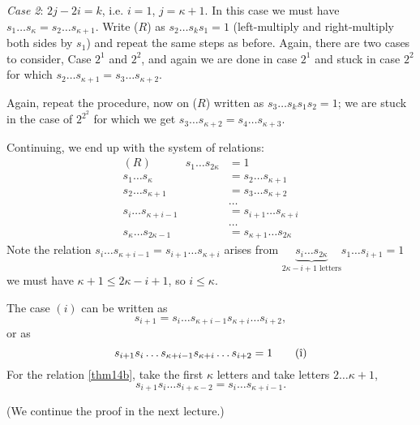 {\em Case 2}: $2j-2i=k$, i.e. $i=1$, $j=\kappa+1$. In this case we must have
$s_1 \dots s_\kappa = s_2 \dots s_{\kappa+1}$. Write ($R$) as
$s_2 \dots s_k s_1 = 1$ (left-multiply and right-multiply both sides by $s_1$)
and repeat the same steps as before. Again, there are two cases to consider,
Case $2^1$ and $2^2$, and again we are done in case $2^1$ and stuck in case
$2^2$ for which $s_2 \dots s_{\kappa+1} = s_3 \dots s_{\kappa+2}$.

Again, repeat the procedure, now on ($R$) written as $s_3 \dots s_k s_1 s_2 = 1$;
we are stuck in the case of $2^{2^2}$ for which we get $s_3 \dots s_{\kappa+2}
= s_4 \dots s_{\kappa+3}$.

Continuing, we end up with the system of relations:
\begin{align*}
    (R) \quad \quad \quad s_1 \dots s_{2 \kappa} &= 1 \\
    s_1 \dots s_{\kappa} &= s_2 \dots s_{\kappa+1} \\
    s_2 \dots s_{\kappa+1} &= s_3 \dots s_{\kappa+2} \\
    & \dots \\
    s_i \dots s_{\kappa+i-1} &= s_{i+1} \dots s_{\kappa+i} \\
    & \dots \\
    s_\kappa \dots s_{2\kappa-1} &= s_{\kappa+1} \dots s_{2\kappa}
\end{align*}
Note the relation $s_i \dots s_{\kappa+i-1} = s_{i+1} \dots s_{\kappa+i}$ arises
from $\underbrace{s_i \dots s_{2\kappa}}_{2\kappa-i+1 \text{ letters}}
s_1 \dots s_{i+1} = 1$ we must have $\kappa+1 \leq 2\kappa-i+1$, so $i \leq \kappa$.

The case $(i)$ can be written as
\[
    s_{i+1} = s_i \dots s_{\kappa+i-1} s_{\kappa+i} \dots s_{i+2},
\]
or as
\begin{equation} \label{thm14b}
    s_{i+1} s_i \dots s_{\kappa+i-1} s_{\kappa+i} \dots s_{i+2} = 1
    \tag{\^{i}}
\end{equation}
For the relation \eqref{thm14b}, take the first $\kappa$ letters and take letters
$2 \dots \kappa+1$,
\[
    s_{i+1} s_i \dots s_{i+\kappa-2} = s_i \dots s_{\kappa+i-1}.
\]

(We continue the proof in the next lecture.)


